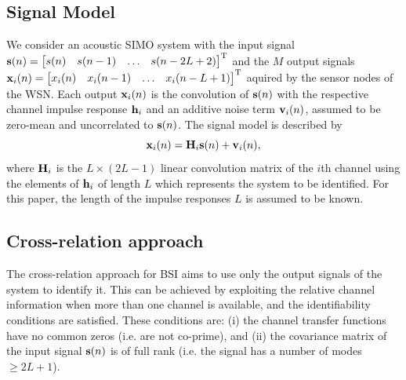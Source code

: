 \documentclass{article}
\newcommand{\h}{\mtxb{h}}
\newcommand{\x}{\mtxb{x}}
\begin{document}
\subsection{Signal Model}
\label{ssec:signal_model}
We consider an acoustic SIMO system with the input signal \(\bm{\mathrm{s}}(n) = \begin{bmatrix}
    s(n)&s(n-1)&\ldots&s(n-2L+2)
\end{bmatrix}^{{\mathrm{T}}}\) and the \(M\) output signals \(\x_i(n)= \begin{bmatrix}
    x_i(n)&x_i(n-1)&\ldots&x_i(n-L+1)
\end{bmatrix}^{\T}\) aquired by the sensor nodes of the WSN.
Each output \(\x_i(n)\) is the convolution of \(\bm{\mathrm{s}}(n)\) with the respective channel impulse response \(\h_i\) and an additive noise term \(\bm{\mathrm{v}}_i(n)\), assumed to be zero-mean and uncorrelated to \(\bm{\mathrm{s}}(n)\).
The signal model is described by
\begin{equation}
    \x_i(n) = \mtxb{H}_i \mtxb{s}(n) + \mtxb{v}_i(n),
\end{equation}
where \(\bm{\mathrm{H}}_i\) is the \(L \times (2L-1)\) linear convolution matrix of the \(i\)th channel using the elements of \(\h_i\) of length \(L\) which represents the system to be identified.
For this paper, the length of the impulse responses \(L\) is assumed to be known.

\subsection{Cross-relation approach}
\label{ssec:cross_rel}
The cross-relation approach for BSI aims to use only the output signals of the system to identify it.
This can be achieved by exploiting the relative channel information when more than one channel is available, and the identifiability conditions \cite{guanghanxuLeastsquaresApproachBlind1995} are satisfied. These conditions are: (i) the channel transfer functions have no common zeros (i.e. are not co-prime), and (ii) the covariance matrix of the input signal \(\bm{\mathrm{s}}(n)\) is of full rank (i.e. the signal has a number of modes \(\geq 2L+1\)).
\end{document}
